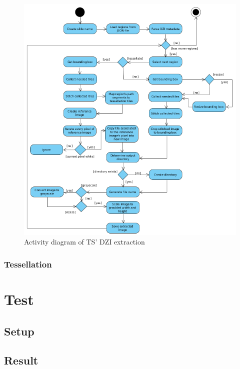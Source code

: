 \begin{figure}[H]
	\begin{center}
		\includegraphics[scale=0.4]{img/ts_dzi_uml.png}
		\caption{Activity diagram of TS' DZI extraction}
		\label{fig5_tsDziUml}
	\end{center}
\end{figure}


\subsubsection{Tessellation}


\section{Test}
\subsection{Setup}
\subsection{Result}